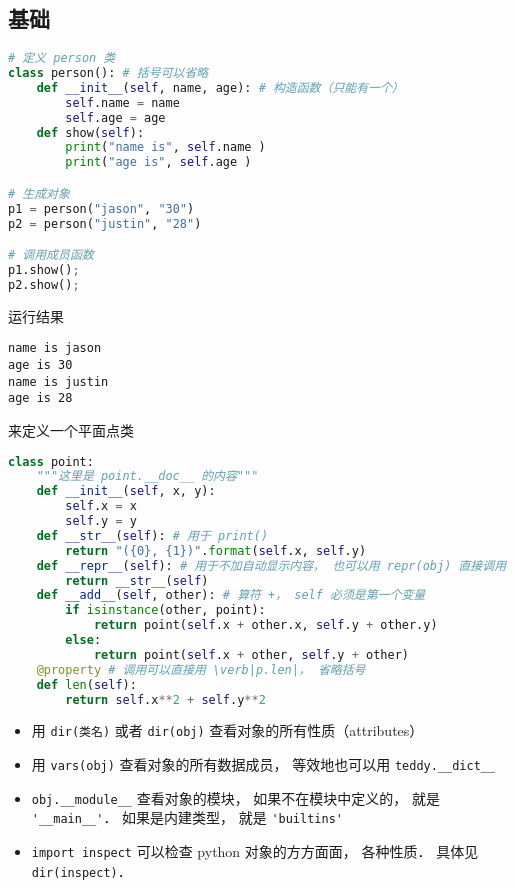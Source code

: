 
\begin{issues}
\issueDraft
\end{issues}


\subsection{基础}
\begin{lstlisting}[language=python]
# 定义 person 类
class person(): # 括号可以省略
    def __init__(self, name, age): # 构造函数（只能有一个）
        self.name = name 
        self.age = age 
    def show(self): 
        print("name is", self.name ) 
        print("age is", self.age ) 

# 生成对象
p1 = person("jason", "30") 
p2 = person("justin", "28")

# 调用成员函数
p1.show();
p2.show();
\end{lstlisting}
运行结果
\begin{lstlisting}[language=none]
name is jason
age is 30
name is justin
age is 28
\end{lstlisting}

来定义一个平面点类
\begin{lstlisting}[language=python]
class point:
    """这里是 point.__doc__ 的内容"""
    def __init__(self, x, y): 
        self.x = x 
        self.y = y 
    def __str__(self): # 用于 print()
        return "({0}, {1})".format(self.x, self.y)
    def __repr__(self): # 用于不加自动显示内容， 也可以用 repr(obj) 直接调用
        return __str__(self)
    def __add__(self, other): # 算符 +， self 必须是第一个变量
        if isinstance(other, point):
            return point(self.x + other.x, self.y + other.y)
        else:
            return point(self.x + other, self.y + other)
    @property # 调用可以直接用 \verb|p.len|， 省略括号
    def len(self):
        return self.x**2 + self.y**2
\end{lstlisting}

\begin{itemize}
\item 用 \verb|dir(类名)| 或者 \verb|dir(obj)| 查看对象的所有性质（attributes）
\item 用 \verb|vars(obj)| 查看对象的所有数据成员， 等效地也可以用 \verb|teddy.__dict__|
\item \verb|obj.__module__| 查看对象的模块， 如果不在模块中定义的， 就是 \verb|'__main__'|． 如果是内建类型， 就是 \verb|'builtins'|
\item \verb|import inspect| 可以检查 python 对象的方方面面， 各种性质． 具体见 \verb|dir(inspect)|．
\end{itemize}


